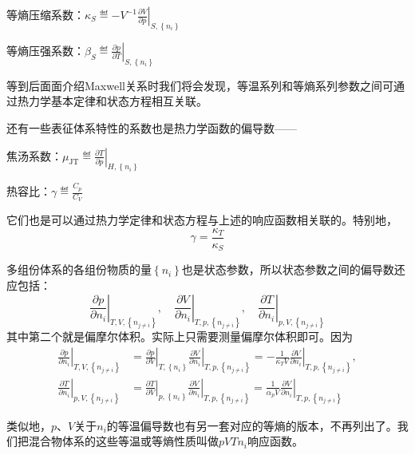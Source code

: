 \documentclass[main.tex]{subfiles}
\begin{document}
等熵压缩系数：$\kappa_S\eqdef -V^{-1}\left.\frac{\partial V}{\partial p}\right|_{S,\left\{n_i\right\}}$

等熵压强系数：$\beta_S\eqdef\left.\frac{\partial p}{\partial T}\right|_{S,\left\{n_i\right\}}$

等到后面面介绍Maxwell关系时我们将会发现，等温系列和等熵系列参数之间可通过热力学基本定律和状态方程相互关联。

还有一些表征体系特性的系数也是热力学函数的偏导数——

焦汤系数：$\mu_\text{JT}\eqdef\left.\frac{\partial T}{\partial p}\right|_{H,\left\{n_i\right\}}$

热容比：$\gamma\eqdef\frac{C_p}{C_V}$

它们也是可以通过热力学定律和状态方程与上述的响应函数相关联的。特别地，
\begin{equation}
    \gamma=\frac{\kappa_T}{\kappa_S}
\end{equation}

多组份体系的各组份物质的量$\left\{n_i\right\}$也是状态参数，所以状态参数之间的偏导数还应包括：
\[\left.\frac{\partial p}{\partial n_i}\right|_{T,V,\left\{n_{j\neq i}\right\}},\quad\left.\frac{\partial V}{\partial n_i}\right|_{T,p,\left\{n_{j\neq i}\right\}},\quad\left.\frac{\partial T}{\partial n_i}\right|_{p,V,\left\{n_{j\neq i}\right\}}\]
其中第二个就是偏摩尔体积。实际上只需要测量偏摩尔体积即可。因为
\begin{align*}
    \left.\frac{\partial p}{\partial n_i}\right|_{T,V,\left\{n_{j\neq i}\right\}} & =\left.\frac{\partial p}{\partial V}\right|_{T,\left\{n_i\right\}}\left.\frac{\partial V}{\partial n_i}\right|_{T,p,\left\{n_{j\neq i}\right\}}=-\frac{1}{\kappa_TV}\left.\frac{\partial V}{\partial n_i}\right|_{T,p,\left\{n_{j\neq i}\right\}}, \\
    \left.\frac{\partial T}{\partial n_i}\right|_{p,V,\left\{n_{j\neq i}\right\}} & =\left.\frac{\partial T}{\partial V}\right|_{p,\left\{n_i\right\}}\left.\frac{\partial V}{\partial n_i}\right|_{T,p,\left\{n_{j\neq i}\right\}}=\frac{1}{\alpha_p V}\left.\frac{\partial V}{\partial n_i}\right|_{T,p,\left\{n_{j\neq i}\right\}}
\end{align*}

类似地，$p$、$V$关于$n_i$的等温偏导数也有另一套对应的等熵的版本，不再列出了。我们把混合物体系的这些等温或等熵性质叫做$pVTn_i$响应函数。
\end{document}

